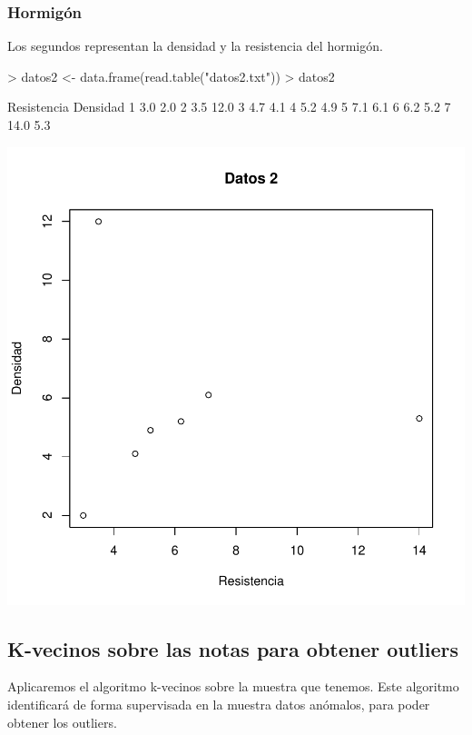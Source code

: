 \documentclass [a4paper] {article}
\begin{document}
\subsubsection{Hormigón}
Los segundos representan la densidad y la resistencia del hormigón.
\begin{Schunk}
\begin{Sinput}
> datos2 <- data.frame(read.table("datos2.txt"))
> datos2
\end{Sinput}
\begin{Soutput}
  Resistencia Densidad
1         3.0      2.0
2         3.5     12.0
3         4.7      4.1
4         5.2      4.9
5         7.1      6.1
6         6.2      5.2
7        14.0      5.3
\end{Soutput}
\end{Schunk}
\begin{center}
\includegraphics{entrega-plot_datos2}
\end{center}

\newpage
\subsection{K-vecinos sobre las notas para obtener outliers}
Aplicaremos el algoritmo k-vecinos sobre la muestra que tenemos.
Este algoritmo identificará de forma supervisada en la muestra datos anómalos, para poder obtener los outliers.
\end{document}
